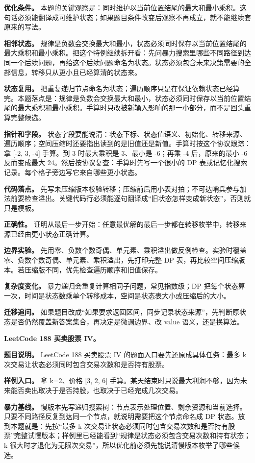 \textbf{优化条件。} 本题的关键观察是：同时维护以当前位置结尾的最大和最小乘积。这句话必须能翻译成可维护状态；如果题目条件改变后观察不再成立，就不能继续套原来的写法。

\textbf{相邻状态。} 规律是负数会交换最大和最小，状态必须同时保存以当前位置结尾的最大乘积和最小乘积。把这个特例继续拆开看：先问暴力搜索里哪些不同路径到达同一个后续问题，再给这个后续问题命名为状态。状态必须包含未来决策需要的全部信息，转移只从更小且已经算清的状态来。

\textbf{状态复用。} 把重复递归节点命名为状态；遍历顺序只是在保证依赖状态已经算完。本题落点是：规律是负数会交换最大和最小，状态必须同时保存以当前位置结尾的最大乘积和最小乘积。手算时只改被新输入影响的那一小部分，而不是回头重算完整候选。

\textbf{指针和字段。} 状态字段要能说清：状态下标、状态值语义、初始化、转移来源、遍历顺序；空间压缩时还要指出读到的是旧值还是新值。手算时按这个协议跟踪：拿 [-2, 3, -4] 手算。到 3 时最大乘积是 3、最小是 -6；再乘 -4 后，原来的最小 -6 反而变成最大 24。然后按协议复查：手算时先写一个很小的 DP 表或记忆化搜索记录。每个格子旁边写它来自哪些更小状态。

\textbf{代码落点。} 先写未压缩版本校验转移；压缩前后用小表对拍；不可达哨兵参与加法前要检查溢出。关键代码行必须能逐句翻译成“旧状态怎样变成新状态”，否则就只是模板。

\textbf{正确性。} 证明从最后一步开始：任意最优解的最后一步都在转移枚举中，转移来源已经由更小状态正确计算。

\textbf{边界实验。} 先用零、负数个数奇偶、单元素、乘积溢出做反例检查。实验时覆盖零、负数个数奇偶、单元素、乘积溢出，先打印完整 DP 表，再比较空间压缩版本。若压缩版不同，优先检查遍历顺序和旧值保存。

\textbf{复杂度变化。} 暴力递归会重复计算相同子问题，常见指数级；DP 把每个状态算一次，时间是状态数乘单个转移成本，空间是状态表大小或压缩后的大小。

\textbf{迁移追问。} 如果题目改成“如果要求返回区间，同步记录状态来源”，先判断原状态是否仍然覆盖新答案集合，再决定是微调边界、改 value 语义，还是换算法。

\noindent\textbf{LeetCode 188 买卖股票 IV。}

\textbf{题目说明。} LeetCode 188 买卖股票 IV 的题面入口要先还原成具体任务：最多 k 次交易让状态必须同时包含交易次数和是否持有股票。

\textbf{样例入口。} 拿 k=2、价格 [3, 2, 6] 手算。某天结束时只说最大利润不够，因为未来能否卖出取决于是否持股，也取决于已经完成几次交易。

\textbf{暴力基线。} 慢版本先写递归搜索树：节点表示处理位置、剩余资源和当前选择。只要不同路径反复到达同一个节点，就说明需要把这个节点命名成 DP 状态。放到本题就是：先按“最多 k 次交易让状态必须同时包含交易次数和是否持有股票”完整试慢版本；样例里已经能看到“规律是状态必须包含交易次数和持有状态；k 很大时才退化为无限次交易”，所以优化前必须先能说清慢版本枚举了哪些候选。

